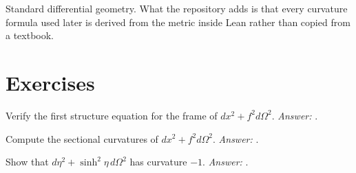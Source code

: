 \begin{standsbox}
Standard differential geometry. What the repository adds is that every curvature formula used later is derived from the metric inside Lean rather than copied from a textbook.
\end{standsbox}

\section*{Exercises}
\begin{exercise}Verify the first structure equation for the frame of $dx^2+f^2d\Omega^2$. \emph{Answer:} .\end{exercise}
\begin{exercise}Compute the sectional curvatures of $dx^2+f^2d\Omega^2$. \emph{Answer:} .\end{exercise}
\begin{exercise}Show that $d\eta^2+\sinh^2\eta\,d\Omega^2$ has curvature $-1$. \emph{Answer:} .\end{exercise}
